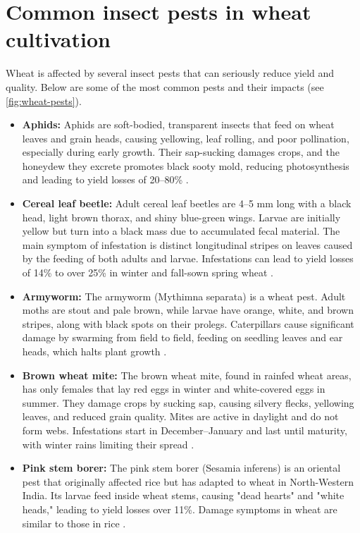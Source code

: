 \section{Common insect pests in wheat cultivation}
Wheat is affected by several insect pests that can seriously reduce yield and quality. Below are some of the most common pests and their impacts (see \autoref{fig:wheat-pests}).
\begin{itemize}
    \item \textbf{Aphids:} Aphids are soft-bodied, transparent insects that feed on wheat leaves and grain heads, causing yellowing, leaf rolling, and poor pollination, especially during early growth. Their sap-sucking damages crops, and the honeydew they excrete promotes black sooty mold, reducing photosynthesis and leading to yield losses of 20–80\% \parencite{duveiller2012wheat,farook2019insect}.

    \item \textbf{Cereal leaf beetle:} Adult cereal leaf beetles are 4–5 mm long with a black head, light brown thorax, and shiny blue-green wings. Larvae are initially yellow but turn into a black mass due to accumulated fecal material. The main symptom of infestation is distinct longitudinal stripes on leaves caused by the feeding of both adults and larvae. Infestations can lead to yield losses of 14\% to over 25\% in winter and fall-sown spring wheat \parencite{duveiller2012wheat}.

    \item \textbf{Armyworm:} The armyworm (Mythimna separata) is a wheat pest. Adult moths are stout and pale brown, while larvae have orange, white, and brown stripes, along with black spots on their prolegs. Caterpillars cause significant damage by swarming from field to field, feeding on seedling leaves and ear heads, which halts plant growth \parencite{farook2019insect}.

    \item \textbf{Brown wheat mite:} The brown wheat mite, found in rainfed wheat areas, has only females that lay red eggs in winter and white-covered eggs in summer. They damage crops by sucking sap, causing silvery flecks, yellowing leaves, and reduced grain quality. Mites are active in daylight and do not form webs. Infestations start in December–January and last until maturity, with winter rains limiting their spread \parencite{kashyap2018identification}.

    \item \textbf{Pink stem borer:} The pink stem borer (Sesamia inferens) is an oriental pest that originally affected rice but has adapted to wheat in North-Western India. Its larvae feed inside wheat stems, causing "dead hearts" and "white heads," leading to yield losses over 11\%. Damage symptoms in wheat are similar to those in rice \parencite{farook2019insect}.


\end{itemize}
